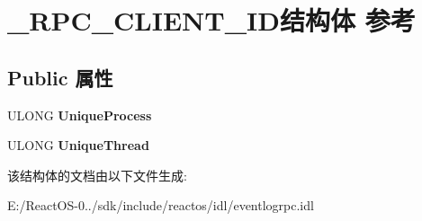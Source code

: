 \hypertarget{struct___r_p_c___c_l_i_e_n_t___i_d}{}\section{\+\_\+\+R\+P\+C\+\_\+\+C\+L\+I\+E\+N\+T\+\_\+\+I\+D结构体 参考}
\label{struct___r_p_c___c_l_i_e_n_t___i_d}
\subsection*{Public 属性}
\begin{DoxyCompactItemize}
\item 
\mbox{\label{struct___r_p_c___c_l_i_e_n_t___i_d_a3ef253b67f1f697c2a1e033096d3d0f7}} 
U\+L\+O\+NG {\bfseries Unique\+Process}
\item 
\mbox{\label{struct___r_p_c___c_l_i_e_n_t___i_d_ae6838271c5434d7ead1e7384b536c26e}} 
U\+L\+O\+NG {\bfseries Unique\+Thread}
\end{DoxyCompactItemize}


该结构体的文档由以下文件生成\+:\begin{DoxyCompactItemize}
\item 
E\+:/\+React\+O\+S-\/0../sdk/include/reactos/idl/eventlogrpc.\+idl\end{DoxyCompactItemize}

